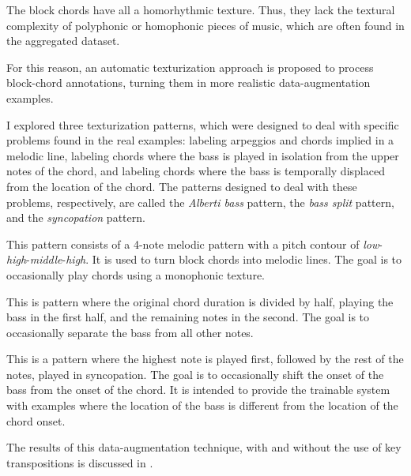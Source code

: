 
The block chords have all a homorhythmic texture. Thus, they
lack the textural complexity of polyphonic or homophonic
pieces of music, which are often found in the aggregated
dataset.

For this reason, an automatic texturization approach is
proposed to process block-chord annotations, turning them in
more realistic data-augmentation examples.

I explored three texturization patterns, which were designed
to deal with specific problems found in the real examples:
labeling arpeggios and chords implied in a melodic line,
labeling chords where the bass is played in isolation from
the upper notes of the chord, and labeling chords where the
bass is temporally displaced from the location of the chord.
The patterns designed to deal with these problems,
respectively, are called the \emph{Alberti bass} pattern,
the \emph{bass split} pattern, and the \emph{syncopation}
pattern.


This pattern consists of a 4-note melodic pattern with a
pitch contour of
\emph{low}-\emph{high}-\emph{middle}-\emph{high}. It is used
to turn block chords into melodic lines. The goal is to
occasionally play chords using a monophonic texture.



This is pattern where the original chord duration is divided
by half, playing the bass in the first half, and the
remaining notes in the second. The goal is to occasionally
separate the bass from all other notes.



This is a pattern where the highest note is played first,
followed by the rest of the notes, played in syncopation.
The goal is to occasionally shift the onset of the bass from
the onset of the chord. It is intended to provide the
trainable system with examples where the location of the
bass is different from the location of the chord onset.


The results of this data-augmentation technique, with and
without the use of key transpositions is discussed in
.
